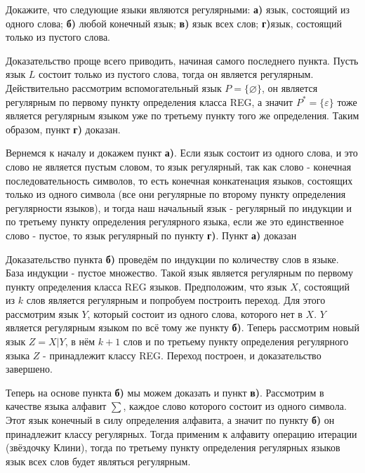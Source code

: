 \begin{question} Докажите, что следующие языки являются регулярными:
    \textbf{а)} язык, состоящий из одного слова; \textbf{б)} любой конечный язык; \textbf{в)} язык всех слов; \textbf{г)}язык, состоящий только из пустого слова.
\end{question}

\begin{nonum}
    Доказательство проще всего приводить, начиная самого последнего пункта. Пусть язык $L$ состоит только из пустого слова, тогда он является регулярным. Действительно рассмотрим вспомогательный язык $P = \{\varnothing\}$, он является регулярным по первому пункту определения класса REG, а значит $P^{*} = \{\varepsilon\}$ тоже является регулярным языком уже по третьему пункту того же определения. Таким образом, пункт \textbf{г)} доказан.

    Вернемся к началу и докажем пункт \textbf{а)}. Если язык состоит из одного слова, и это слово не является пустым словом, то язык регулярный, так как слово - конечная последовательность символов, то есть конечная конкатенация языков, состоящих только из одного символа (все они регулярные по второму пункту определения регулярности языков), и тогда наш начальный язык - регулярный по индукции и по третьему пункту определения регулярного языка, если же это единственное слово - пустое, то язык регулярный по пункту \textbf{г)}. Пункт \textbf{а)} доказан

    Доказательство пункта \textbf{б)} проведём по индукции по количеству слов в языке. База индукции - пустое множество. Такой язык является регулярным по первому пункту определения класса REG языков. Предположим, что язык $X$, состоящий из $k$ слов является регулярным и попробуем построить переход. Для этого рассмотрим язык $Y$, который состоит из одного слова, которого нет в $X$. $Y$ является регулярным языком по всё тому же пункту \textbf{б)}. Теперь рассмотрим новый язык $Z = X|Y$, в нём $k + 1$ слов и по третьему пункту определения регулярного языка $Z$ - принадлежит классу REG. Переход построен, и доказательство завершено.

    Теперь на основе пункта \textbf{б)} мы можем доказать и пункт \textbf{в)}. Рассмотрим в качестве языка алфавит $\sum$, каждое слово которого состоит из одного символа. Этот язык конечный в силу определения алфавита, а значит по пункту \textbf{б)} он принадлежит классу регулярных. Тогда применим к алфавиту операцию итерации (звёздочку Клини), тогда по третьему пункту определения регулярных языков язык всех слов будет являться регулярным.

\end{nonum}


